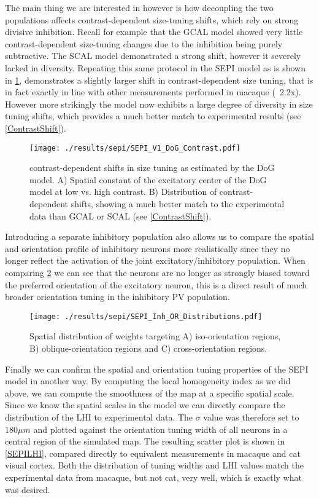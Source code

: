 The main thing we are interested in however is how decoupling the two
populations affects contrast-dependent size-tuning shifts, which rely
on strong divisive inhibition. Recall for example that the GCAL model
showed very little contrast-dependent size-tuning changes due to the
inhibition being purely subtractive. The SCAL model demonstrated a
strong shift, however it severely lacked in diversity. Repeating this
same protocol in the SEPI model as is shown in
\ref{SEPI_DoG_Contrast}, demonstrates a slightly larger shift in
contrast-dependent size tuning, that is in fact exactly in line with
other measurements performed in macaque (~2.2x). However more
strikingly the model now exhibits a large degree of diversity in size
tuning shifts, which provides a much better match to experimental
results (see \ref{ContrastShift}).

\begin{figure}
	\centering
        \texttt{[image: ./results/sepi/SEPI\_V1\_DoG\_Contrast.pdf]}
	\caption{contrast-dependent shifts in size tuning as estimated by
      the DoG model. A) Spatial constant of the excitatory center of
      the DoG model at low vs. high contrast. B) Distribution of
      contrast-dependent shifts, showing a much better match to the
      experimental data than GCAL or SCAL (see \ref{ContrastShift}).}
	\label{SEPI_DoG_Contrast}
\end{figure}

Introducing a separate inhibitory population also allows us to compare
the spatial and orientation profile of inhibitory neurons more
realistically since they no longer reflect the activation of the joint
excitatory/inhibitory population. When comparing
\ref{SEPI_OR_Distributions} we can see that the neurons are no longer
as strongly biased toward the preferred orientation of the excitatory
neuron, this is a direct result of much broader orientation tuning in
the inhibitory PV population.

\begin{figure}
	\centering
        \texttt{[image: ./results/sepi/SEPI\_Inh\_OR\_Distributions.pdf]}
	\caption{Spatial distribution of weights targeting A)
      iso-orientation regions, B) oblique-orientation regions and C)
      cross-orientation regions.}
	\label{SEPI_OR_Distributions}
\end{figure}

Finally we can confirm the spatial and orientation tuning properties
of the SEPI model in another way. By computing the local homogeneity
index as we did above, we can compute the smoothness of the map at a
specific spatial scale. Since we know the spatial scales in the model
we can directly compare the distribution of the LHI to experimental
data. The $\sigma$ value was therefore set to $180 \mu m$ and plotted
against the orientation tuning width of all neurons in a central
region of the simulated map. The resulting scatter plot is shown in
\ref{SEPILHI}, compared directly to equivalent measurements in macaque
and cat visual cortex. Both the distribution of tuning widths and LHI
values match the experimental data from macaque, but not cat, very
well, which is exactly what was desired.

